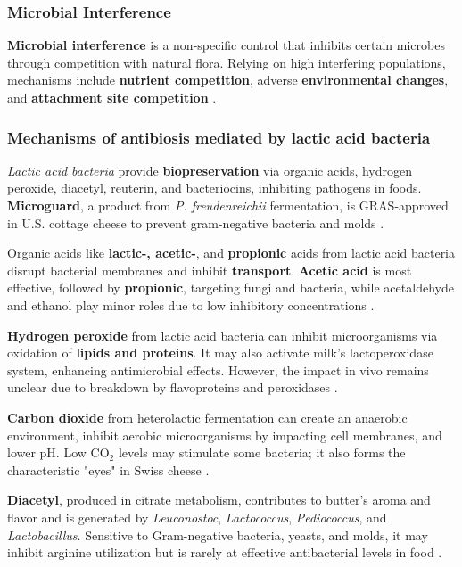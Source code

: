 \subsubsection*{Microbial Interference}
\textbf{Microbial interference} is a non-specific control that inhibits certain microbes through competition with natural flora. Relying on high interfering populations, mechanisms include \textbf{nutrient competition}, adverse \textbf{environmental changes}, and \textbf{attachment site competition} \cite*{L8-MicroInFood}.

\subsubsection{Mechanisms of antibiosis mediated by lactic acid bacteria}
\textit{Lactic acid bacteria} provide \textbf{biopreservation} via organic acids, hydrogen peroxide, diacetyl, reuterin, and bacteriocins, inhibiting pathogens in foods. \textbf{Microguard}, a product from \textit{P. freudenreichii} fermentation, is GRAS-approved in U.S. cottage cheese to prevent gram-negative bacteria and molds \cite*{L8-MicroInFood}.

Organic acids like \textbf{lactic-, acetic-}, and \textbf{propionic} acids from lactic acid bacteria disrupt bacterial membranes and inhibit \textbf{transport}. \textbf{Acetic acid} is most effective, followed by \textbf{propionic}, targeting fungi and bacteria, while acetaldehyde and ethanol play minor roles due to low inhibitory concentrations \cite*{L8-MicroInFood}.

\textbf{Hydrogen peroxide} from lactic acid bacteria can inhibit microorganisms via oxidation of \textbf{lipids and proteins}. It may also activate milk's lactoperoxidase system, enhancing antimicrobial effects. However, the impact in vivo remains unclear due to breakdown by flavoproteins and peroxidases \cite*{L8-MicroInFood}.

\textbf{Carbon dioxide} from heterolactic fermentation can create an anaerobic environment, inhibit aerobic microorganisms by impacting cell membranes, and lower pH. Low CO$_2$ levels may stimulate some bacteria; it also forms the characteristic "eyes" in Swiss cheese \cite*{L8-MicroInFood}.

\textbf{Diacetyl}, produced in citrate metabolism, contributes to butter's aroma and flavor and is generated by \textit{Leuconostoc}, \textit{Lactococcus}, \textit{Pediococcus}, and \textit{Lactobacillus}. Sensitive to Gram-negative bacteria, yeasts, and molds, it may inhibit arginine utilization but is rarely at effective antibacterial levels in food \cite*{L8-MicroInFood}.

